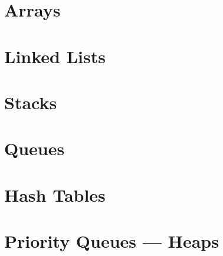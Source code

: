 \documentclass[10pt, letterpaper]{article}
\begin{document}
\section*{Arrays}
\section*{Linked Lists}
\section*{Stacks}
\section*{Queues}
\section*{Hash Tables}
\section*{Priority Queues --- Heaps}
\end{document}
